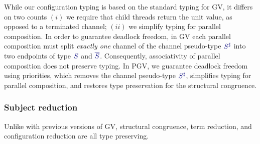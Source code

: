 \documentclass[main.tex]{subfiles}
\begin{document}
While our configuration typing is based on the standard typing for GV, it differs on two counts
$(i)$ we require that child threads return the unit value, as opposed to a terminated channel;
$(ii)$ we simplify typing for parallel composition.
In order to guarantee deadlock freedom, in GV each parallel composition must split \emph{exactly one} channel of the channel pseudo-type $\ty{S^\sharp}$ into two endpoints of type $\ty{S}$ and $\ty{\co{S}}$. Consequently, associativity of parallel composition does not preserve typing. In PGV, we guarantee deadlock freedom using priorities, which removes the channel pseudo-type $\ty{S^\sharp}$, simplifies typing for parallel composition, and restores type preservation for the structural congruence.


\subsubsection*{Subject reduction}
Unlike with previous versions of GV, structural congruence, term reduction, and configuration reduction are all type preserving.
\end{document}
